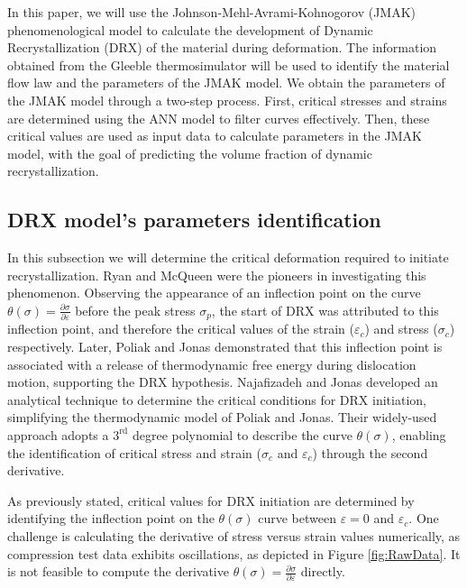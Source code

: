 \documentclass[metals,article,submit,pdftex,moreauthors]{Definitions/mdpi}
\begin{document}
In this paper, we will use the Johnson-Mehl-Avrami-Kohnogorov (JMAK) phenomenological model \cite{Avrami-1939} to calculate the development of Dynamic Recrystallization (DRX) of the material during deformation.
The information obtained from the Gleeble thermosimulator will be used to identify the material flow law and the parameters of the JMAK model.
We obtain the parameters of the JMAK model through a two-step process.
First, critical stresses and strains are determined using the ANN model to filter curves effectively.
Then, these critical values are used as input data to calculate parameters in the JMAK model, with the goal of predicting the volume fraction of dynamic recrystallization.

\subsection{DRX model's parameters identification\label{subsec:DRXParameters}}

In this subsection we will determine the critical deformation required to initiate recrystallization.
Ryan and McQueen \cite{ryan1989dynamic, ryan1990dynamic, ryan1990flow} were the pioneers in investigating this phenomenon.
Observing the appearance of an inflection point on the curve $\theta(\sigma)=\frac{\partial \sigma}{\partial \varepsilon}$ before the peak stress $\sigma_p$, the start of DRX was attributed to this inflection point, and therefore the critical values of the strain ($\varepsilon_c$) and stress ($\sigma_c$) respectively.
Later, Poliak and Jonas \cite{Poliak-1996, Poliak-2003, Poliak-2003-2, jonas2003critical} demonstrated that this inflection point is associated with a release of thermodynamic free energy during dislocation motion, supporting the DRX hypothesis.
Najafizadeh and Jonas \cite{Najafizadeh-2006} developed an analytical technique to determine the critical conditions for DRX initiation, simplifying the thermodynamic model of Poliak and Jonas.
Their widely-used approach adopts a $3^\text{rd}$ degree polynomial to describe the curve $\theta(\sigma)$, enabling the identification of critical stress and strain ($\sigma_c$ and $\varepsilon_c$) through the second derivative.

As previously stated, critical values for DRX initiation are determined by identifying the inflection point on the $\theta(\sigma)$ curve between $\varepsilon=0$ and $\varepsilon_c$.
One challenge is calculating the derivative of stress versus strain values numerically, as compression test data exhibits oscillations, as depicted in Figure \ref{fig:RawData}.
It is not feasible to compute the derivative $\theta(\sigma)=\frac{\partial \sigma}{\partial \varepsilon}$ directly.
\end{document}
